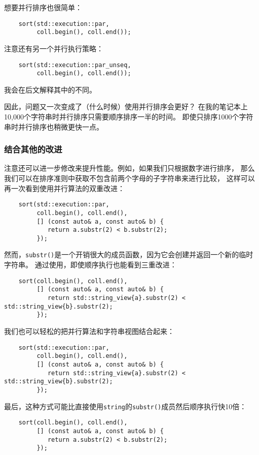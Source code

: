 想要并行排序也很简单：
\begin{lstlisting}
    sort(std::execution::par,
         coll.begin(), coll.end());
\end{lstlisting}
注意还有另一个并行执行策略：
\begin{lstlisting}
    sort(std::execution::par_unseq,
         coll.begin(), coll.end());
\end{lstlisting}
我会在后文解释其中的不同。

因此，问题又一次变成了（什么时候）使用并行排序会更好？
在我的笔记本上10,000个字符串时并行排序只需要顺序排序一半的时间。
即使只排序1000个字符串时并行排序也稍微更快一点。

\subsubsection{结合其他的改进}\label{ch22.1.2.1}
注意还可以进一步修改来提升性能。例如，如果我们只根据数字进行排序，
那么我们可以在排序准则中获取不包含前两个字母的子字符串来进行比较，
这样可以再一次看到使用并行算法的双重改进：
\begin{lstlisting}
    sort(std::execution::par,
         coll.begin(), coll.end(),
         [] (const auto& a, const auto& b) {
            return a.substr(2) < b.substr(2);
         });
\end{lstlisting}
然而，\texttt{substr()}是一个开销很大的成员函数，因为它会创建并返回一个新的临时字符串。
通过使用，即使顺序执行也能看到三重改进：
\begin{lstlisting}
    sort(coll.begin(), coll.end(),
         [] (const auto& a, const auto& b) {
            return std::string_view{a}.substr(2) < std::string_view{b}.substr(2);
         });
\end{lstlisting}
我们也可以轻松的把并行算法和字符串视图结合起来：
\begin{lstlisting}
    sort(std::execution::par,
         coll.begin(), coll.end(),
         [] (const auto& a, const auto& b) {
            return std::string_view{a}.substr(2) < std::string_view{b}.substr(2);
         });
\end{lstlisting}
最后，这种方式可能比直接使用\texttt{string}的\texttt{substr()}成员然后顺序执行快10倍：
\begin{lstlisting}
    sort(coll.begin(), coll.end(),
         [] (const auto& a, const auto& b) {
            return a.substr(2) < b.substr(2);
         });
\end{lstlisting}


